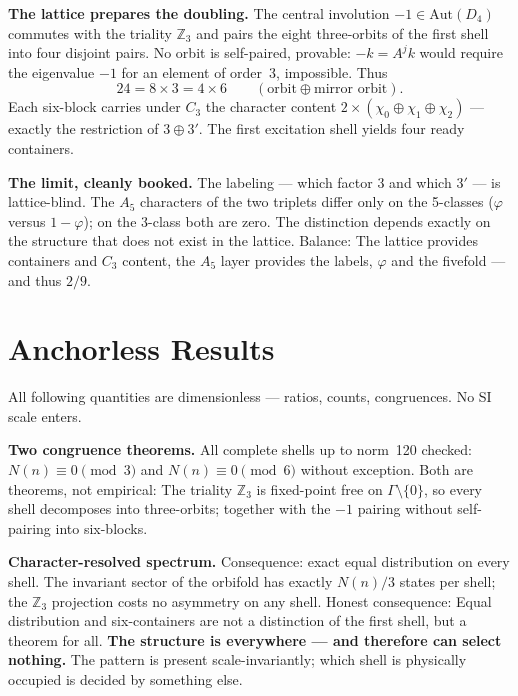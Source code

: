 \textbf{The lattice prepares the doubling.} The central
involution $-1\in\mathrm{Aut}(D_4)$ commutes with the triality $\mathbb{Z}_3$
and pairs the eight three-orbits of the first shell into four disjoint
pairs. No orbit is self-paired, provable: $-k = A^jk$ would require
the eigenvalue $-1$ for an element of order~3, impossible. Thus
\begin{equation}
  24 = 8\times3 = 4\times6\qquad(\text{orbit}\oplus\text{mirror orbit}).
\end{equation}
Each six-block carries under $C_3$ the character content
$2\times(\chi_0\oplus\chi_1\oplus\chi_2)$ --- exactly the restriction of
$3\oplus3'$. The first excitation shell yields four ready containers.

\textbf{The limit, cleanly booked.} The labeling --- which factor
$3$ and which $3'$ --- is lattice-blind. The $A_5$ characters of the
two triplets differ only on the 5-classes ($\varphi$
versus $1-\varphi$); on the 3-class both are zero. The distinction
depends exactly on the structure that does not exist in the lattice. Balance: The
lattice provides containers and $C_3$ content, the $A_5$ layer provides the
labels, $\varphi$ and the fivefold --- and thus $2/9$.

\section{Anchorless Results}

All following quantities are dimensionless --- ratios, counts,
congruences. No SI scale enters.

\textbf{Two congruence theorems.} All complete shells up to norm~120
checked: $N(n)\equiv0\pmod3$ and $N(n)\equiv0\pmod6$ without exception. Both
are theorems, not empirical: The triality $\mathbb{Z}_3$ is fixed-point free on
$\Gamma\setminus\{0\}$, so every shell decomposes into
three-orbits; together with the $-1$ pairing without self-pairing into
six-blocks.

\textbf{Character-resolved spectrum.} Consequence: exact
equal distribution on every shell. The invariant sector of the orbifold
has exactly $N(n)/3$ states per shell; the $\mathbb{Z}_3$ projection
costs no asymmetry on any shell. Honest consequence:
Equal distribution and six-containers are not a distinction of the first
shell, but a theorem for all. \textbf{The structure is everywhere --- and
therefore can select nothing.} The pattern is present scale-invariantly;
which shell is physically occupied is decided by something else.

